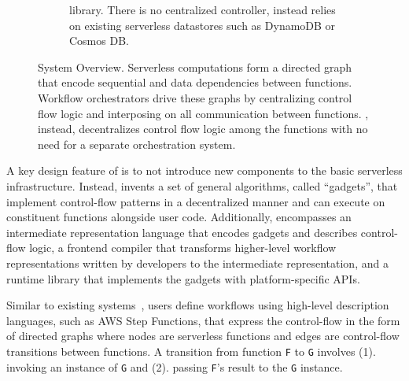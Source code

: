 \begin{figure}[t]
\begin{subfigure}[b]{\columnwidth}
{			library. There is no centralized controller, instead \name{} relies on existing
			serverless datastores such as DynamoDB or Cosmos DB.}
		\label{fig:arch:unum-runtime}
	\end{subfigure}
	\caption{\name{} System Overview. Serverless computations form a directed
		graph that encode sequential and data dependencies between functions. Workflow
		orchestrators drive these graphs by centralizing control flow logic and
		interposing on all communication between functions. \name{},
		instead, decentralizes control flow logic among the functions with
		no need for a separate orchestration system.}
	\label{fig:arch}
\end{figure}



A key design feature of \name{} is to not introduce new components to the
basic serverless infrastructure. Instead, \name{} invents a set of general
algorithms, called ``gadgets'', that implement control-flow patterns in a
decentralized manner and can execute on constituent functions alongside user
code. Additionally, \name{} encompasses an intermediate representation
language that encodes gadgets and describes control-flow logic, a frontend
compiler that transforms higher-level workflow representations written by
developers to the intermediate representation, and a runtime library that
implements the gadgets with platform-specific APIs.

Similar to existing systems~\cite{aws-step-functions, google-workflows,
	google-cloud-composer, gg-atc}, \name{} users define workflows using
high-level description languages, such as AWS Step Functions, that express the
control-flow in the form of directed graphs where nodes are serverless
functions and edges are control-flow transitions between functions. A
transition from function \texttt{F} to \texttt{G} involves (1). invoking an
instance of \texttt{G} and (2). passing \texttt{F}'s result to the \texttt{G}
instance.

